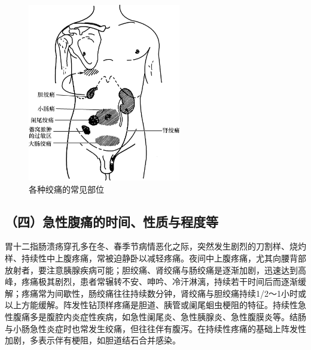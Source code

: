 \begin{figure}[!htbp]
 \centering
 \includegraphics[width=2.625in,height=3.0625in]{./images/Image00137.jpg}
 \captionsetup{justification=centering}
 \caption{各种绞痛的常见部位}
 \label{fig25-2}
  \end{figure} 

\subsection{（四）急性腹痛的时间、性质与程度等}

胃十二指肠溃疡穿孔多在冬、春季节病情恶化之际，突然发生剧烈的刀割样、烧灼样、持续性中上腹疼痛，常被迫静卧以减轻疼痛。夜间中上腹疼痛，尤其向腰背部放射者，要注意胰腺疾病可能；胆绞痛、肾绞痛与肠绞痛是逐渐加剧，迅速达到高峰，疼痛极其剧烈，患者常辗转不安、呻吟、冷汗淋漓，持续若干时间后而逐渐缓解；疼痛常为间歇性，肠绞痛往往持续数分钟，肾绞痛与胆绞痛持续1/2～1小时或以上方能缓解。阵发性钻顶样疼痛是胆道、胰管或阑尾蛔虫梗阻的特征。持续性急性腹痛多是腹腔内炎症性疾病，如急性阑尾炎、急性胰腺炎、急性腹膜炎等。结肠与小肠急性炎症时也常发生绞痛，但往往伴有腹泻。在持续性疼痛的基础上阵发性加剧，多表示伴有梗阻，如胆道结石合并感染。

